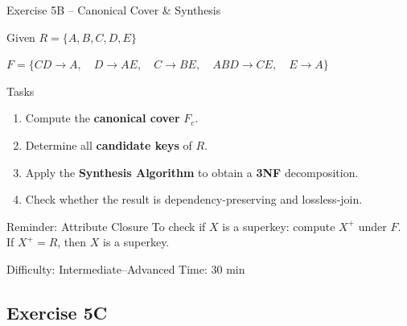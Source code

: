 \documentclass[10pt]{beamer}
\begin{document}
\begin{frame}{Exercise 5B -- Canonical Cover \& Synthesis}
  \begin{block}{Given}
    $R = \{A, B, C, D, E\}$

    \vspace{4pt}
    $F = \{CD \to A,\quad D \to AE,\quad C \to BE,\quad ABD \to CE,\quad E \to A\}$
  \end{block}

  \begin{block}{Tasks}
    \begin{enumerate}
      \item Compute the \textbf{canonical cover} $F_c$.
      \item Determine all \textbf{candidate keys} of $R$.
      \item Apply the \textbf{Synthesis Algorithm} to obtain a \textbf{3NF} decomposition.
      \item Check whether the result is dependency-preserving and lossless-join.
    \end{enumerate}
  \end{block}

  \begin{block}{Reminder: Attribute Closure}
    To check if $X$ is a superkey: compute $X^+$ under $F$.\\
    If $X^+ = R$, then $X$ is a superkey.
  \end{block}

  \begin{alertblock}{Difficulty: Intermediate--Advanced \quad Time: 30 min}
  \end{alertblock}
\end{frame}

\subsection{Exercise 5C}
\end{document}
